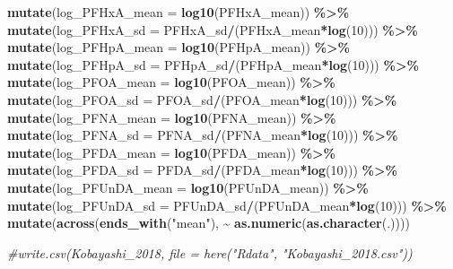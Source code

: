 \documentclass[
]{article}
\newenvironment{Shaded}{\begin{snugshade}}{\end{snugshade}}
\newcommand{\AttributeTok}[1]{\textcolor[rgb]{0.13,0.29,0.53}{#1}}
\newcommand{\CommentTok}[1]{\textcolor[rgb]{0.56,0.35,0.01}{\textit{#1}}}
\newcommand{\DecValTok}[1]{\textcolor[rgb]{0.00,0.00,0.81}{#1}}
\newcommand{\FunctionTok}[1]{\textcolor[rgb]{0.13,0.29,0.53}{\textbf{#1}}}
\newcommand{\NormalTok}[1]{#1}
\newcommand{\SpecialCharTok}[1]{\textcolor[rgb]{0.81,0.36,0.00}{\textbf{#1}}}
\newcommand{\StringTok}[1]{\textcolor[rgb]{0.31,0.60,0.02}{#1}}
\begin{document}
\begin{Shaded}
\begin{Highlighting}[]
  \FunctionTok{mutate}\NormalTok{(}\AttributeTok{log\_PFHxA\_mean =} \FunctionTok{log10}\NormalTok{(PFHxA\_mean)) }\SpecialCharTok{\%\textgreater{}\%} 
  \FunctionTok{mutate}\NormalTok{(}\AttributeTok{log\_PFHxA\_sd =}\NormalTok{ PFHxA\_sd}\SpecialCharTok{/}\NormalTok{(PFHxA\_mean}\SpecialCharTok{*}\FunctionTok{log}\NormalTok{(}\DecValTok{10}\NormalTok{))) }\SpecialCharTok{\%\textgreater{}\%}
  \FunctionTok{mutate}\NormalTok{(}\AttributeTok{log\_PFHpA\_mean =} \FunctionTok{log10}\NormalTok{(PFHpA\_mean)) }\SpecialCharTok{\%\textgreater{}\%} 
  \FunctionTok{mutate}\NormalTok{(}\AttributeTok{log\_PFHpA\_sd =}\NormalTok{ PFHpA\_sd}\SpecialCharTok{/}\NormalTok{(PFHpA\_mean}\SpecialCharTok{*}\FunctionTok{log}\NormalTok{(}\DecValTok{10}\NormalTok{))) }\SpecialCharTok{\%\textgreater{}\%}
  \FunctionTok{mutate}\NormalTok{(}\AttributeTok{log\_PFOA\_mean =} \FunctionTok{log10}\NormalTok{(PFOA\_mean)) }\SpecialCharTok{\%\textgreater{}\%} 
  \FunctionTok{mutate}\NormalTok{(}\AttributeTok{log\_PFOA\_sd =}\NormalTok{ PFOA\_sd}\SpecialCharTok{/}\NormalTok{(PFOA\_mean}\SpecialCharTok{*}\FunctionTok{log}\NormalTok{(}\DecValTok{10}\NormalTok{))) }\SpecialCharTok{\%\textgreater{}\%}
  \FunctionTok{mutate}\NormalTok{(}\AttributeTok{log\_PFNA\_mean =} \FunctionTok{log10}\NormalTok{(PFNA\_mean)) }\SpecialCharTok{\%\textgreater{}\%} 
  \FunctionTok{mutate}\NormalTok{(}\AttributeTok{log\_PFNA\_sd =}\NormalTok{ PFNA\_sd}\SpecialCharTok{/}\NormalTok{(PFNA\_mean}\SpecialCharTok{*}\FunctionTok{log}\NormalTok{(}\DecValTok{10}\NormalTok{))) }\SpecialCharTok{\%\textgreater{}\%}
  \FunctionTok{mutate}\NormalTok{(}\AttributeTok{log\_PFDA\_mean =} \FunctionTok{log10}\NormalTok{(PFDA\_mean)) }\SpecialCharTok{\%\textgreater{}\%} 
  \FunctionTok{mutate}\NormalTok{(}\AttributeTok{log\_PFDA\_sd =}\NormalTok{ PFDA\_sd}\SpecialCharTok{/}\NormalTok{(PFDA\_mean}\SpecialCharTok{*}\FunctionTok{log}\NormalTok{(}\DecValTok{10}\NormalTok{))) }\SpecialCharTok{\%\textgreater{}\%}
  \FunctionTok{mutate}\NormalTok{(}\AttributeTok{log\_PFUnDA\_mean =} \FunctionTok{log10}\NormalTok{(PFUnDA\_mean)) }\SpecialCharTok{\%\textgreater{}\%} 
  \FunctionTok{mutate}\NormalTok{(}\AttributeTok{log\_PFUnDA\_sd =}\NormalTok{ PFUnDA\_sd}\SpecialCharTok{/}\NormalTok{(PFUnDA\_mean}\SpecialCharTok{*}\FunctionTok{log}\NormalTok{(}\DecValTok{10}\NormalTok{))) }\SpecialCharTok{\%\textgreater{}\%}
  \FunctionTok{mutate}\NormalTok{(}\FunctionTok{across}\NormalTok{(}\FunctionTok{ends\_with}\NormalTok{(}\StringTok{"mean"}\NormalTok{), }\SpecialCharTok{\textasciitilde{}} \FunctionTok{as.numeric}\NormalTok{(}\FunctionTok{as.character}\NormalTok{(.))))}

\CommentTok{\#write.csv(Kobayashi\_2018, file = here("Rdata", "Kobayashi\_2018.csv"))}
\end{Highlighting}
\end{Shaded}
\end{document}
